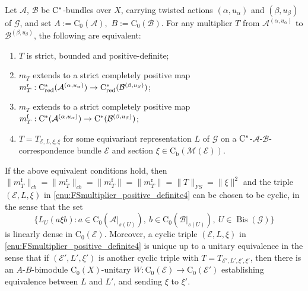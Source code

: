 \documentclass[10pt,a4paper]{amsart}
\newcommand{\A}{\mathcal A}
\newcommand{\B}{\mathcal B}
\DeclareMathOperator{\Bis}{Bis}
\newcommand{\EE}{\mathcal E}
\newcommand{\G}{\mathcal G} %
\newcommand{\M}{\mathcal M}
\newcommand*{\contb}{\mathrm{C_b}}%
\newcommand*{\contz}{\mathrm{C_0}}%
\newcommand{\cst}{\ifmmode\mathrm{C}^*\else{$\mathrm{C}^*$}\fi}
\DeclareMathOperator{\f}{f}%
\newcommand{\m}{m}
\DeclareMathOperator{\rd}{r}%
\DeclareMathOperator{\red}{red}%
\begin{document}
\begin{thm}\label{thm:FSmultiplier_positive_definite}
Let $\A$, $\B$ be $\cst$-bundles over $X$, carrying twisted actions $(\alpha,u_\alpha)$ and $(\beta,u_\beta)$ of $\G$, and set $A:=\contz(\A),$ $B:=\contz(\B)$. 
For any multiplier $T$ from $\A^{(\alpha,u_{\alpha})}$ to $\B^{(\beta,u_{\beta})}$, the following are equivalent: 
\begin{enumerate}
	\item\label{enu:FSmultiplier_positive_definite1} $T$ is  strict, bounded and positive-definite;
    \item\label{enu:FSmultiplier_positive_definite2} $\m_T$ %
	extends to a strict completely positive map $\m_T^{\rd} : \cst_{\red}(\A^{(\alpha,u_{\alpha})}) \to \cst_{\red}(\B^{(\beta,u_{\beta})})$;
	\item\label{enu:FSmultiplier_positive_definite3} $\m_T$ %
	extends to a strict completely positive map $\m_T^{\f}:\cst(\A^{(\alpha,u_{\alpha})}) \to \cst(\B^{(\beta,u_{\beta})})$;
	\item\label{enu:FSmultiplier_positive_definite4} $T = T_{\EE,L,\xi,\xi}$ %
	for some equivariant representation $L$ of $\G$ on a $\cst$-$\A$-$\B$-correspondence bundle $\EE$ and section $\xi\in \contb(\M(\EE))$.
\end{enumerate}	
If the above equivalent conditions hold, then  $\| \m_T^{\f} \|_{cb} = \| \m_T^{\rd} \|_{cb} = \| \m_T^{\f} \| = \| \m_T^{\rd} \| = \| T \|_{FS} = \| \xi \|^2$ and the triple $(\EE,L,\xi)$ in \ref{enu:FSmultiplier_positive_definite4} can be chosen to be cyclic, in the sense that the set
\[
    \{ L_U (a \xi b) : a \in \contz(\A|_{s(U)}) ,\ b \in \contz(\B|_{s(U)}) ,\ U\in \Bis(\G) \}
\]
is linearly dense in $\contz(\EE)$. 
Moreover, a cyclic triple $(\EE,L,\xi)$ in \ref{enu:FSmultiplier_positive_definite4} is unique up to a unitary equivalence in the sense that if  $(\EE',L',\xi')$ is another cyclic triple with $T=T_{\EE',L',\xi',\xi'}$, then there is an $A$-$B$-bimodule $\contz(X)$-unitary $W:\contz(\EE)\to \contz (\EE')$ establishing equivalence between $L$ and $L'$, and sending $\xi$ to $\xi'$.
\end{thm}
\end{document}
